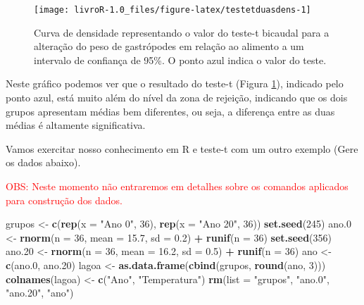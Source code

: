 \documentclass[14pt,titlepage, oneside, openany, a4paper]{book}
\newenvironment{Shaded}{\begin{snugshade}}{\end{snugshade}}
\newcommand{\DataTypeTok}[1]{\textcolor[rgb]{0.13,0.29,0.53}{#1}}
\newcommand{\DecValTok}[1]{\textcolor[rgb]{0.00,0.00,0.81}{#1}}
\newcommand{\FloatTok}[1]{\textcolor[rgb]{0.00,0.00,0.81}{#1}}
\newcommand{\KeywordTok}[1]{\textcolor[rgb]{0.13,0.29,0.53}{\textbf{#1}}}
\newcommand{\NormalTok}[1]{#1}
\newcommand{\OperatorTok}[1]{\textcolor[rgb]{0.81,0.36,0.00}{\textbf{#1}}}
\newcommand{\StringTok}[1]{\textcolor[rgb]{0.31,0.60,0.02}{#1}}
\begin{document}
\begin{figure}[H]

{\centering \texttt{[image: livroR-1.0\_files/figure-latex/testetduasdens-1]} 

}

\caption{Curva de densidade representando o valor do teste-t bicaudal para a alteração do peso de gastrópodes em relação ao alimento a um intervalo de confiança de 95\%. O ponto azul indica o valor do teste.}\label{fig:testetduasdens}
\end{figure}

Neste gráfico podemos ver que o resultado do teste-t (Figura \ref{fig:testetduasdens}), indicado pelo ponto azul, está muito além do nível da zona de rejeição, indicando que os dois grupos apresentam médias bem diferentes, ou seja, a diferença entre as duas médias é altamente significativa.

Vamos exercitar nosso conhecimento em R e teste-t com um outro exemplo (Gere os dados abaixo).

\textcolor{red}{OBS: Neste momento não entraremos em detalhes sobre os comandos aplicados para construção dos dados.}

\begin{Shaded}
\begin{Highlighting}[]
\NormalTok{grupos <-}\StringTok{ }\KeywordTok{c}\NormalTok{(}\KeywordTok{rep}\NormalTok{(}\DataTypeTok{x =} \StringTok{"Ano 0"}\NormalTok{, }\DecValTok{36}\NormalTok{), }\KeywordTok{rep}\NormalTok{(}\DataTypeTok{x =} \StringTok{"Ano 20"}\NormalTok{, }\DecValTok{36}\NormalTok{))}
\KeywordTok{set.seed}\NormalTok{(}\DecValTok{245}\NormalTok{)}
\NormalTok{ano}\FloatTok{.0}\NormalTok{ <-}\StringTok{ }\KeywordTok{rnorm}\NormalTok{(}\DataTypeTok{n =} \DecValTok{36}\NormalTok{, }\DataTypeTok{mean =} \FloatTok{15.7}\NormalTok{, }\DataTypeTok{sd =} \FloatTok{0.2}\NormalTok{) }\OperatorTok{+}\StringTok{ }\KeywordTok{runif}\NormalTok{(}\DataTypeTok{n =} \DecValTok{36}\NormalTok{)}
\KeywordTok{set.seed}\NormalTok{(}\DecValTok{356}\NormalTok{)}
\NormalTok{ano}\FloatTok{.20}\NormalTok{ <-}\StringTok{ }\KeywordTok{rnorm}\NormalTok{(}\DataTypeTok{n =} \DecValTok{36}\NormalTok{, }\DataTypeTok{mean =} \FloatTok{16.2}\NormalTok{, }\DataTypeTok{sd =} \FloatTok{0.5}\NormalTok{) }\OperatorTok{+}\StringTok{ }\KeywordTok{runif}\NormalTok{(}\DataTypeTok{n =} \DecValTok{36}\NormalTok{)}
\NormalTok{ano <-}\StringTok{ }\KeywordTok{c}\NormalTok{(ano}\FloatTok{.0}\NormalTok{, ano}\FloatTok{.20}\NormalTok{)}
\NormalTok{lagoa <-}\StringTok{ }\KeywordTok{as.data.frame}\NormalTok{(}\KeywordTok{cbind}\NormalTok{(grupos, }\KeywordTok{round}\NormalTok{(ano, }\DecValTok{3}\NormalTok{)))}
\KeywordTok{colnames}\NormalTok{(lagoa) <-}\StringTok{ }\KeywordTok{c}\NormalTok{(}\StringTok{"Ano"}\NormalTok{, }\StringTok{"Temperatura"}\NormalTok{)}
\KeywordTok{rm}\NormalTok{(}\DataTypeTok{list =} \StringTok{"grupos"}\NormalTok{, }\StringTok{"ano.0"}\NormalTok{, }\StringTok{"ano.20"}\NormalTok{, }\StringTok{"ano"}\NormalTok{)}
\end{Highlighting}
\end{Shaded}
\end{document}
